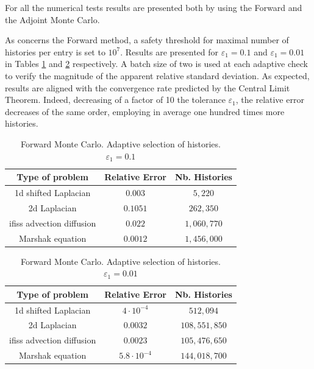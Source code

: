 For all the numerical tests results are presented both by using the Forward
and the Adjoint Monte Carlo.

As concerns the Forward method, a safety threshold for maximal number of
histories per
entry is set to $10^7$. Results are presented for
$\varepsilon_1=0.1$ and $\varepsilon_1=0.01$ in Tables \ref{tab:For_adapt} and
\ref{tab:For_adapt2} respectively. A batch size of two is used at each
adaptive check to verify the magnitude of the apparent relative standard
deviation. As expected, results are aligned with the convergence rate predicted
by the Central Limit Theorem. Indeed, decreasing of a factor of 10 the
tolerance $\varepsilon_1$, the relative error decreases of the same order,
employing in average one hundred times more histories.\newline


\begin{table}[!h]
\centering
\begin{tabular}{|c|c|c|}
\hline
\textbf{Type of problem} & \textbf{Relative Error} &\textbf{Nb. Histories}\\
\hline
1d shifted Laplacian & $0.003$ & $5,220$\\
\hline
2d Laplacian & $0.1051$ & $262,350$\\
\hline
ifiss advection diffusion & $0.022$  & $1,060,770$\\
\hline
Marshak equation & $0.0012$ & $1,456,000$\\
\hline
\end{tabular}
\caption{Forward Monte Carlo. Adaptive selection of histories.
$\varepsilon_1=0.1$}
\label{tab:For_adapt}
\end{table}

\begin{table}[!h]
\centering
\begin{tabular}{|c|c|c|}
\hline
\textbf{Type of problem} & \textbf{Relative Error} &\textbf{Nb. Histories}\\
\hline
1d shifted Laplacian & $4\cdot 10^{-4}$ & $512,094$\\
\hline
2d Laplacian & $0.0032$ & $108,551,850$\\
\hline
ifiss advection diffusion & $0.0023$  & $105,476,650$\\
\hline
Marshak equation & $5.8 \cdot 10^{-4}$ & $144,018,700$\\
\hline
\end{tabular}
\caption{Forward Monte Carlo. Adaptive selection of histories.
$\varepsilon_1=0.01$}
\label{tab:For_adapt2}
\end{table}

